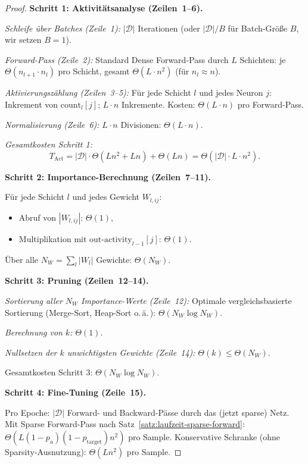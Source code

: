 \documentclass[a4paper,12pt]{report}
\theoremstyle{definition}
\begin{document}
	\begin{proof}
		\textbf{Schritt 1: Aktivitätsanalyse (Zeilen~1--6).}

		\textit{Schleife über Batches (Zeile~1):} $|\mathcal{D}|$ Iterationen (oder $|\mathcal{D}|/B$ für Batch-Größe $B$, wir setzen $B=1$).

		\textit{Forward-Pass (Zeile~2):} Standard Dense Forward-Pass durch $L$ Schichten: je $\Theta(n_{l+1} \cdot n_l)$ pro Schicht, gesamt $\Theta(L \cdot n^2)$ (für $n_l \approx n$).

		\textit{Aktivierungszählung (Zeilen~3--5):} Für jede Schicht $l$ und jedes Neuron $j$: Inkrement von $\mathrm{count}_l[j]$; $L \cdot n$ Inkremente. Kosten: $\Theta(L \cdot n)$ pro Forward-Pass.

		\textit{Normalisierung (Zeile~6):} $L \cdot n$ Divisionen: $\Theta(L \cdot n)$.

		\textit{Gesamtkosten Schritt 1:}
		\[
			T_{\mathrm{Act}} = |\mathcal{D}| \cdot \Theta(L n^2 + L n) + \Theta(L n) = \Theta(|\mathcal{D}| \cdot L \cdot n^2).
		\]

		\textbf{Schritt 2: Importance-Berechnung (Zeilen~7--11).}

		Für jede Schicht $l$ und jedes Gewicht $W_{l,ij}$:
		\begin{itemize}
			\item Abruf von $|W_{l,ij}|$: $\Theta(1)$,
			\item Multiplikation mit $\mathrm{out\text{-}activity}_{l-1}[j]$: $\Theta(1)$.
		\end{itemize}
		Über alle $N_W = \sum_l |W_l|$ Gewichte: $\Theta(N_W)$.

		\textbf{Schritt 3: Pruning (Zeilen~12--14).}

		\textit{Sortierung aller $N_W$ Importance-Werte (Zeile~12):} Optimale vergleichsbasierte Sortierung (Merge-Sort, Heap-Sort o.\,ä.\,): $\Theta(N_W \log N_W)$.

		\textit{Berechnung von $k$:} $\Theta(1)$.

		\textit{Nullsetzen der $k$ unwichtigsten Gewichte (Zeile~14):} $\Theta(k) \leq \Theta(N_W)$.

		Gesamtkosten Schritt 3: $\Theta(N_W \log N_W)$.

		\textbf{Schritt 4: Fine-Tuning (Zeile~15).}

		Pro Epoche: $|\mathcal{D}|$ Forward- und Backward-Pässe durch das (jetzt sparse) Netz. Mit Sparse Forward-Pass nach Satz~\ref{satz:laufzeit-sparse-forward}: $\Theta(L(1-p_a)(1-p_{\mathrm{target}})n^2)$ pro Sample. Konservative Schranke (ohne Sparsity-Ausnutzung): $\Theta(L n^2)$ pro Sample.


\end{proof}
\end{document}
